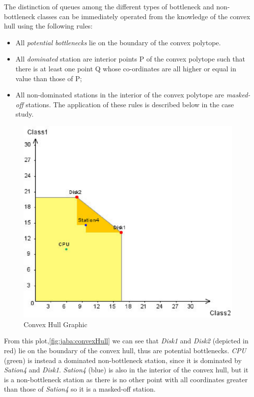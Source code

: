 The distinction of queues among the different types of bottleneck and non-bottleneck classes can be immediately operated from the knowledge of the convex hull using the following rules:
\begin{itemize}
	\item All \emph{potential bottlenecks} lie on the boundary of the convex polytope.
	\item All \emph{dominated} station are interior points P of the convex polytope such that there is at least one point Q whose co-ordinates are all higher or equal in value than those of P; 
	\item All non-dominated stations in the interior of the convex polytope are \emph{masked-off} stations. 
The application of these rules is described below in the case study.
\end{itemize}
\begin{figure}[htbp]
    \begin{center}
        \includegraphics[scale=.5]{img/jaba/convexHull}
    \end{center}
    \caption{Convex Hull Graphic}
    \label{fig:jaba:convexHull}
\end{figure}

From this plot,\autoref{fig:jaba:convexHull} we can see that \emph{Disk1} and \emph{Disk2} (depicted in red) lie on the boundary of the convex hull, thus are potential bottlenecks. \emph{CPU} (green) is instead a dominated non-bottleneck station, since  it is dominated by \emph{Sation4} and \emph{Disk1}. \emph{Sation4} (blue) is also in the interior of the convex hull, but it is a non-bottleneck station as there is no other point with all coordinates greater than those of \emph{Sation4} so it is a masked-off station.

